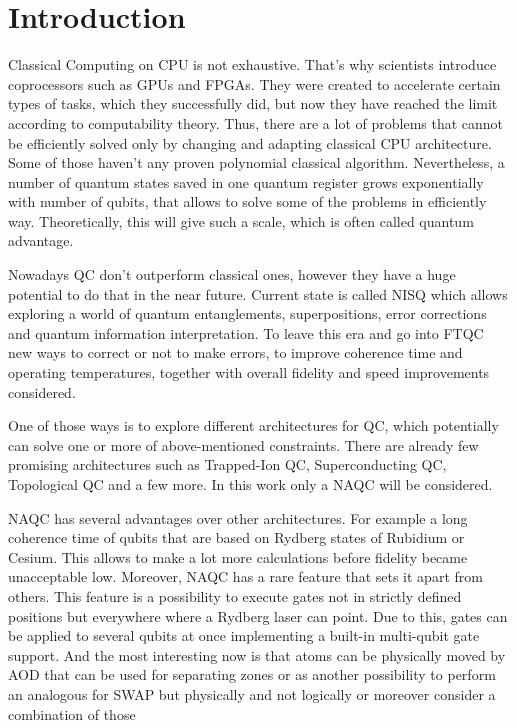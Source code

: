 
\chapter{Introduction}\label{chapter:introduction}
Classical Computing on CPU is not exhaustive. That's why scientists introduce coprocessors such as GPUs and FPGAs.
They were created to accelerate certain types of tasks, which they successfully did, 
but now they have reached the limit according to computability theory.
Thus, there are a lot of problems that cannot be efficiently solved only by changing and adapting classical CPU architecture.
Some of those haven't any proven polynomial classical algorithm.
Nevertheless, a number of quantum states saved in one quantum register grows exponentially with number of qubits, 
that allows to solve some of the problems in efficiently way.
Theoretically, this will give such a scale, which is often called quantum advantage.

Nowadays \ac{QC} don't outperform classical ones, however they have a huge potential to do that in the near future. 
Current state is called \ac{NISQ} which allows exploring a world of quantum entanglements, 
superpositions, error corrections and quantum information interpretation.
To leave this era and go into \ac{FTQC} new ways to correct or not to make errors, 
to improve coherence time and operating temperatures, together with overall fidelity and speed improvements considered.

One of those ways is to explore different architectures for \ac{QC}, which potentially can solve one or more of above-mentioned constraints.
There are already few promising architectures such as Trapped-Ion \ac{QC}, Superconducting \ac{QC}, Topological \ac{QC} and a few more.
In this work only a \ac{NAQC} will be considered. 

\ac{NAQC} has several advantages over other architectures.
For example a long coherence time of qubits that are based on Rydberg states of Rubidium or Cesium.
This allows to make a lot more calculations before fidelity became unacceptable low. 
Moreover, \ac{NAQC} has a rare feature that sets it apart from others.
This feature is a possibility to execute gates not in strictly defined positions but everywhere where a Rydberg laser can point.
Due to this, gates can be applied to several qubits at once implementing a built-in multi-qubit gate support.
And the most interesting now is that atoms can be physically moved by \ac{AOD} 
that can be used for separating zones or as another possibility 
to perform an analogous for SWAP but physically and not logically or moreover consider a combination of those

